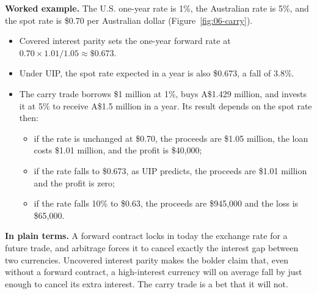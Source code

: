 \textbf{Worked example.} The U.S. one-year rate is 1\%, the Australian rate is 5\%, and the spot rate is \$0.70 per Australian dollar (Figure~\ref{fig:06-carry}).

\begin{itemize}
  \item Covered interest parity sets the one-year forward rate at $0.70 \times 1.01/1.05 \approx \$0.673$.
  \item Under UIP, the spot rate expected in a year is also \$0.673, a fall of 3.8\%.
  \item The carry trade borrows \$1 million at 1\%, buys A\$1.429 million, and invests it at 5\% to receive A\$1.5 million in a year. Its result depends on the spot rate then:
  \begin{itemize}
    \item if the rate is unchanged at \$0.70, the proceeds are \$1.05 million, the loan costs \$1.01 million, and the profit is \$40,000;
    \item if the rate falls to \$0.673, as UIP predicts, the proceeds are \$1.01 million and the profit is zero;
    \item if the rate falls 10\% to \$0.63, the proceeds are \$945,000 and the loss is \$65,000.
  \end{itemize}
\end{itemize}

\noindent\textbf{In plain terms.} A forward contract locks in today the exchange rate for a future trade, and arbitrage forces it to cancel exactly the interest gap between two currencies. Uncovered interest parity makes the bolder claim that, even without a forward contract, a high-interest currency will on average fall by just enough to cancel its extra interest. The carry trade is a bet that it will not.

